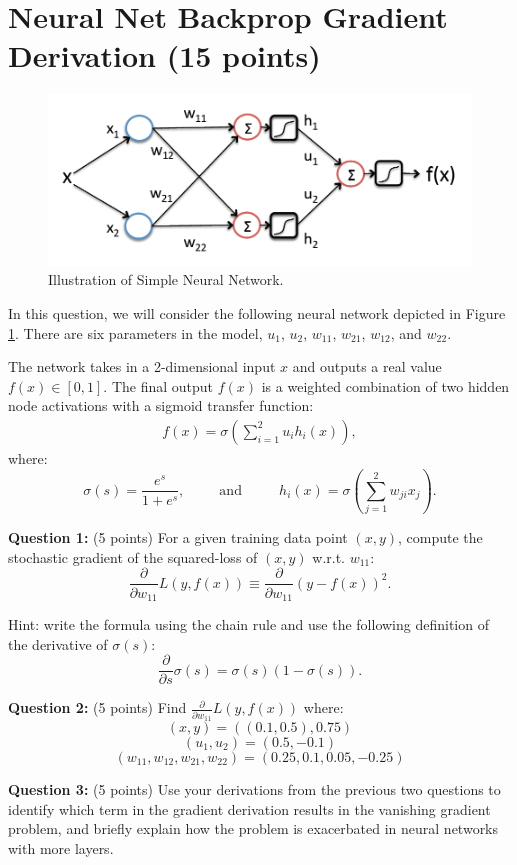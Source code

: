 
\section{Neural Net Backprop Gradient Derivation (15 points)}

\begin{figure}[h]
\centering
\includegraphics[scale=0.27]{image/neural_net_1.png}
\vspace{-0.1in}
\caption{Illustration of Simple Neural Network.}
\label{fig:neuralnet}
\end{figure}

In this question, we will consider the following neural network depicted in Figure \ref{fig:neuralnet}.  There are six parameters in the model, $u_1$, $u_2$, $w_{11}$, $w_{21}$, $w_{12}$, and $w_{22}$.

The network takes in a 2-dimensional input $x$ and outputs a real value $f(x) \in [0,1]$.  The final output $f(x)$ is a weighted combination of two hidden node activations with a sigmoid transfer function:
\begin{eqnarray}
f(x) = \sigma \left(\sum_{i=1}^2 u_i h_i(x) \right),
\end{eqnarray}
where:
$$\sigma(s) = \frac{e^s}{1+e^s},\ \ \ \ \ \ \ \ \ \ \ \mbox{and}\ \ \ \ \ \ \ \ \ \ \ \ 
h_i(x) = \sigma\left(\sum_{j=1}^2 w_{ji} x_j\right).$$

\smallskip

\textbf{Question 1:} (5 points)
For a given training data point $(x,y)$, compute the stochastic gradient of the squared-loss of $(x,y)$ w.r.t. $w_{11}$:
$$\frac{\partial}{\partial w_{11}} L(y,f(x)) \equiv \frac{\partial}{\partial w_{11}}\left(y - f(x)\right)^2.$$

Hint: write the formula using the chain rule and use the following definition of the derivative of $\sigma(s)$:
$$\frac{\partial}{\partial s}  \sigma(s) = \sigma(s)(1-\sigma(s)).$$
\bigskip

\textbf{Question 2:} (5 points)
Find $\frac{\partial}{\partial w_{11}} L(y,f(x))$ where:
$$(x, y) = ((0.1, 0.5), 0.75)$$
$$(u_1, u_2) = (0.5, -0.1)$$
$$(w_{11}, w_{12}, w_{21}, w_{22}) = (0.25, 0.1, 0.05, -0.25)$$
\smallskip

\textbf{Question 3:}  (5 points)
Use your derivations from the previous two questions to identify which term in the gradient derivation results in the vanishing gradient problem, and briefly explain how the problem is exacerbated in neural networks with more layers.
\smallskip


